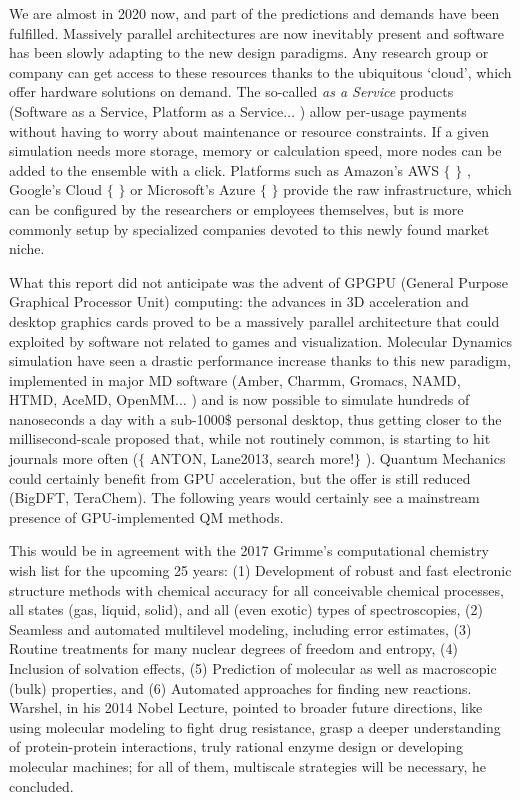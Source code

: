 We are almost in 2020 now, and part of the predictions and demands have been fulfilled. Massively parallel architectures are now inevitably present and software has been slowly adapting to the new design paradigms. Any research group or company can get access to these resources thanks to the ubiquitous ‘cloud’, which offer hardware solutions on demand. The so-called \textit{as a Service}  products (Software as a Service, Platform as a Service$ \ldots $ ) allow per-usage payments without having to worry about maintenance or resource constraints. If a given simulation needs more storage, memory or calculation speed, more nodes can be added to the ensemble with a click. Platforms such as Amazon’s AWS $ \{ $ $ \} $ , Google’s Cloud $ \{ $ $ \} $  or Microsoft’s Azure $ \{ $ $ \} $  provide the raw infrastructure, which can be configured by the researchers or employees themselves, but is more commonly setup by specialized companies devoted to this newly found market niche.

What this report did not anticipate was the advent of GPGPU (General Purpose Graphical Processor Unit) computing: the advances in 3D acceleration and desktop graphics cards proved to be a massively parallel architecture that could exploited by software not related to games and visualization. Molecular Dynamics simulation have seen a drastic performance increase thanks to this new paradigm, implemented in major MD software (Amber, Charmm, Gromacs, NAMD, HTMD, AceMD, OpenMM$ \ldots $ ) and is now possible to simulate hundreds of nanoseconds a day with a sub-1000$\$$  personal desktop, thus getting closer to the millisecond-scale proposed that, while not routinely common, is starting to hit journals more often ($ \{ $ ANTON, Lane2013, search more!$ \} $ ). Quantum Mechanics could certainly benefit from GPU acceleration, but the offer is still reduced (BigDFT, TeraChem). The following years would certainly see a mainstream presence of GPU-implemented QM methods.

This would be in agreement with the 2017 Grimme’s computational chemistry wish list for the upcoming 25 years: (1) Development of robust and fast electronic structure methods with chemical accuracy for all conceivable chemical processes, all states (gas, liquid, solid), and all (even exotic) types of spectroscopies, (2) Seamless and automated multilevel modeling, including error estimates, (3) Routine treatments for many nuclear degrees of freedom and entropy, (4) Inclusion of solvation effects, (5) Prediction of molecular as well as macroscopic (bulk) properties, and (6) Automated approaches for finding new reactions. Warshel, in his 2014 Nobel Lecture, pointed to broader future directions, like using molecular modeling to fight drug resistance, grasp a deeper understanding of protein-protein interactions, truly rational enzyme design or developing molecular machines; for all of them, multiscale strategies will be necessary, he concluded.\cite{Warshel2014}

